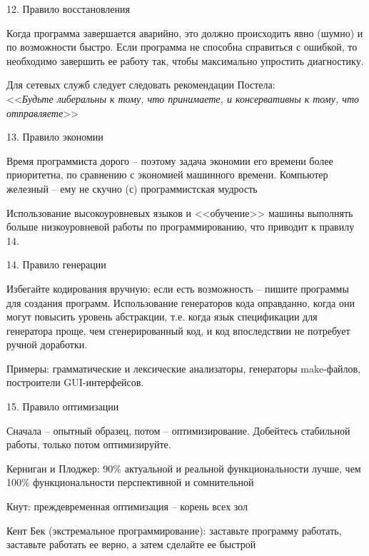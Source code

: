\begin{frame}{12. Правило восстановления}
	\begin{block}{Когда программа завершается аварийно,  это должно происходить явно (шумно) и по возможности быстро.}
		\pause
		Если программа не способна справиться с ошибкой,  то необходимо завершить ее работу так,  чтобы максимально упростить диагностику.
	\end{block}
	\pause
	Для сетевых служб следует следовать рекомендации Постела:\\
	<<{\itshape Будьте либеральны к тому,  что принимаете,  и консервативны к тому,  что отправляете}>>
\end{frame}

\begin{frame}{13. Правило экономии}
	\begin{block}{Время программиста дорого -- поэтому задача экономии его времени более приоритетна,  по сравнению с экономией машинного времени.}
		\pause
		Компьютер железный -- ему не скучно (с) программистская мудрость
	\end{block}
	\pause
	Использование высокоуровневых языков и <<обучение>> машины выполнять больше низкоуровневой работы по программированию,  что приводит к правилу 14.
\end{frame}

\begin{frame}{14. Правило генерации}
	\begin{block}{Избегайте кодирования вручную; если есть возможность -- пишите программы для создания программ.}
		\pause
		Использование генераторов кода оправданно,  когда они могут повысить уровень абстракции,  
		т.е. когда язык спецификации для генератора проще,  чем сгенерированный код,  
		и код впоследствии не потребует ручной доработки.
	\end{block}
	\pause
	Примеры: грамматические и лексические анализаторы,  генераторы make-файлов,  построители GUI-интерфейсов.
\end{frame}

\begin{frame}{15. Правило оптимизации}
	\begin{block}{Сначала -- опытный образец,  потом -- оптимизирование.}
		Добейтесь стабильной работы,  только потом оптимизируйте.
	\end{block}
	\pause
	\begin{block}{Керниган и Плоджер:}
		90\% актуальной и реальной функциональности лучше,  чем 100\% функциональности перспективной и сомнительной
	\end{block}
	\pause
	\begin{block}{Кнут:}
		преждевременная оптимизация -- корень всех зол
	\end{block}
	\pause
	\begin{block}{Кент Бек (экстремальное программирование):}
		заставьте программу работать,  заставьте работать ее верно,  а затем сделайте ее быстрой
	\end{block}
\end{frame}

